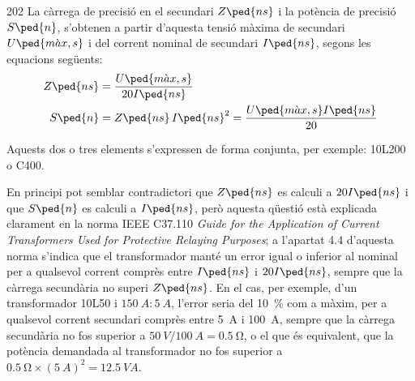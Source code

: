 \begin{dingautolist}{202}
    La càrrega de precisió en el secundari
    $Z\ped{ns}$ i la potència de precisió $S\ped{n}$, s'obtenen a partir d'aquesta
    tensió màxima de secundari $U\ped{m\grave{a}x,s}$
    i del corrent     nominal de secundari $I\ped{ns}$, segons les equacions següents:
    \begin{align}
        Z\ped{ns} &= \frac{U\ped{m\grave{a}x,s}}{20 I\ped{ns}}\\
        S\ped{n} &= Z\ped{ns} \,I\ped{ns}^2 = \frac{U\ped{m\grave{a}x,s} I\ped{ns}}{20}
        \label{eq:sn_ti_ieee}
    \end{align}
\end{dingautolist}

Aquests dos o tres elements s'expressen de forma conjunta, per exemple:
10L200 o C400.

En principi pot semblar contradictori que $Z\ped{ns}$ es calculi a $20 I\ped{ns}$ i que $S\ped{n}$ es calculi a $I\ped{ns}$, però aquesta qüestió està explicada clarament en la norma IEEE C37.110 \textit{ Guide for the Application of Current Transformers Used for Protective Relaying Purposes}; a l'apartat 4.4 d'aquesta norma s'indica que el transformador manté un error igual o inferior al nominal per a qualsevol corrent comprès entre $I\ped{ns}$ i $20 I\ped{ns}$, sempre que la càrrega secundària no superi $Z\ped{ns}$. En el cas, per exemple, d'un transformador 10L50 i $\qty{150}{A}\!:\!\qty{5}{A}$, l'error seria del \qty{10}{\percent} com a màxim, per a qualsevol corrent  secundari comprès entre \qty{5}{A} i \qty{100}{A}, sempre que la càrrega secundària no fos superior a $\qty{50}{V} / \qty{100}{A}= \qty{0,5}{\ohm}$, o el que és equivalent, que la potència  demandada al transformador no fos superior a $\qty{0,5}{\ohm} \times (\qty{5}{A})^2 = \qty{12,5}{VA}$.


